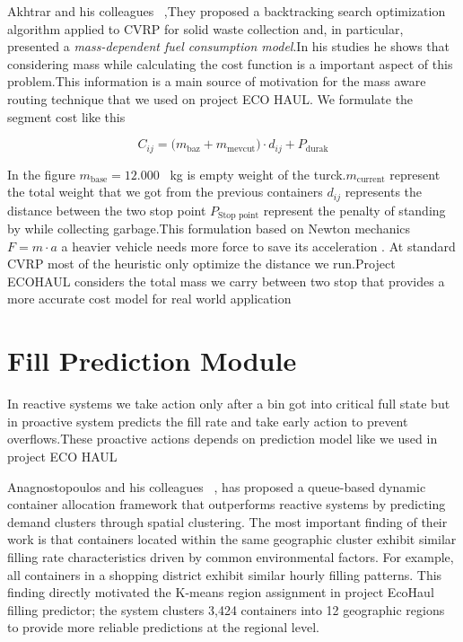 \documentclass[12pt,a4paper]{report}
\begin{document}
\indent Akhtrar and his colleagues ~\cite{akhtar2017},They proposed a backtracking search optimization algorithm applied to CVRP for solid waste collection and, in particular, presented a
\textit{mass-dependent fuel consumption model}.In his studies he shows that considering mass while calculating the cost function is a important aspect of this problem.This information is a main source of motivation for the mass aware routing technique that we used on project ECO HAUL. We formulate the segment cost like this

\begin{equation}
  C_{ij} = \bigl(m_{\text{baz}} + m_{\text{mevcut}}\bigr) \cdot d_{ij} + P_{\text{durak}}
  \label{eq:mass_aware}
\end{equation}

\indent In the figure $m_{\text{base}} = 12{.}000$~ kg is empty weight of the turck.$m_{\text{current}}$ represent the total weight that we got from the previous containers $d_{ij}$ represents the distance between the two stop point $P_{\text{Stop point}}$ represent the penalty of standing by while collecting garbage.This formulation based on Newton mechanics  $F = m \cdot a$ a heavier vehicle needs more force to save its acceleration . At standard CVRP  most of the heuristic only optimize the distance we run.Project ECOHAUL considers the total mass we carry between two stop that provides a more accurate cost model for real world application


\section{Fill Prediction Module}
\indent In reactive systems we take action only after a bin got into critical full state but in proactive system predicts the fill rate and take early action to prevent overflows.These proactive actions depends on prediction model like we used in project ECO HAUL

\indent Anagnostopoulos and his colleagues ~\cite{anagnostopoulos2015}, has proposed a queue-based dynamic container allocation framework that outperforms reactive systems by predicting demand clusters through spatial clustering. The most important finding of their work is that containers located within the same geographic cluster exhibit similar filling rate characteristics driven by common environmental factors. For example, all containers in a shopping district exhibit similar hourly filling patterns. This finding directly motivated the K-means region assignment in project EcoHaul  filling predictor; the system clusters 3,424 containers into 12 geographic regions to provide more reliable predictions at the regional level.
\end{document}
